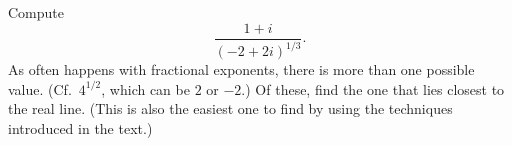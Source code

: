 Compute
\begin{equation*}
  \frac{1+i}{(-2+2i)^{1/3}}.
\end{equation*}
As often happens with fractional exponents, there is more
than one possible value. (Cf.~$4^{1/2}$, which can be $2$ or $-2$.)
Of these, find the one that lies closest to the real line. (This is
also the easiest one to find by using the techniques introduced
in the text.)\answercheck

